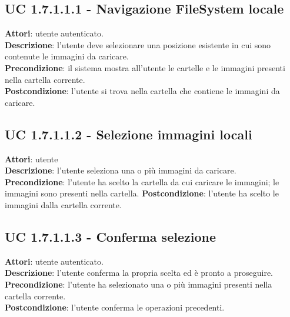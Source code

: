 		\subsection{UC 1.7.1.1.1 - Navigazione FileSystem locale}{
			\label{uc1.7.1.1.1}
			\textbf{Attori}: utente autenticato.\\
			\textbf{Descrizione}: l'utente deve selezionare una posizione esistente in cui sono contenute le immagini da caricare. \\
			\textbf{Precondizione}: il sistema mostra all'utente le cartelle e le immagini presenti nella cartella corrente.	\\
			\textbf{Postcondizione}: l'utente si trova nella cartella che contiene le immagini da caricare.	\\
			}
		\subsection{UC 1.7.1.1.2 - Selezione immagini locali}{
			\label{uc1.7.1.1.2}
			\textbf{Attori}: utente \\
			\textbf{Descrizione}: l'utente seleziona una o più immagini da caricare. \\
			\textbf{Precondizione}: l'utente ha scelto la cartella da cui caricare le immagini; le immagini sono presenti nella cartella.
			\textbf{Postcondizione}: l'utente ha scelto le immagini dalla cartella corrente.	\\
			}
		\subsection{UC 1.7.1.1.3 - Conferma selezione}{
			\label{uc1.7.1.1.3}
			\textbf{Attori}: utente autenticato.\\
			\textbf{Descrizione}: l'utente conferma la propria scelta ed è pronto a proseguire. \\
			\textbf{Precondizione}: l'utente ha selezionato una o più immagini presenti nella cartella corrente.	\\
			\textbf{Postcondizione}: l'utente conferma le operazioni precedenti.	\\
			}
